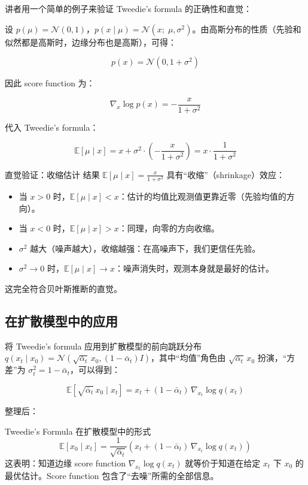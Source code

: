 \documentclass[a4paper]{article}
\begin{document}
讲者用一个简单的例子来验证 Tweedie's formula 的正确性和直觉：

设 $p(\mu) = \mathcal{N}(0, 1)$，$p(x \mid \mu) = \mathcal{N}(x;\; \mu, \sigma^2)$。由高斯分布的性质（先验和似然都是高斯时，边缘分布也是高斯），可得：

$$p(x) = \mathcal{N}(0, 1 + \sigma^2)$$

因此 score function 为：

$$\nabla_x \log p(x) = -\frac{x}{1 + \sigma^2}$$

代入 Tweedie's formula：

$$\mathbb{E}[\mu \mid x] = x + \sigma^2 \cdot \left(-\frac{x}{1+\sigma^2}\right) = x \cdot \frac{1}{1+\sigma^2}$$

\begin{knowledgebox}{直觉验证：收缩估计}
结果 $\mathbb{E}[\mu \mid x] = \frac{x}{1+\sigma^2}$ 具有``收缩''（shrinkage）效应：
\begin{itemize}
    \item 当 $x > 0$ 时，$\mathbb{E}[\mu \mid x] < x$：估计的均值比观测值更靠近零（先验均值的方向）。
    \item 当 $x < 0$ 时，$\mathbb{E}[\mu \mid x] > x$：同理，向零的方向收缩。
    \item $\sigma^2$ 越大（噪声越大），收缩越强：在高噪声下，我们更信任先验。
    \item $\sigma^2 \to 0$ 时，$\mathbb{E}[\mu \mid x] \to x$：噪声消失时，观测本身就是最好的估计。
\end{itemize}
这完全符合贝叶斯推断的直觉。
\end{knowledgebox}

\subsection{在扩散模型中的应用}

将 Tweedie's formula 应用到扩散模型的前向跳跃分布 $q(x_t \mid x_0) = \mathcal{N}(\sqrt{\bar{\alpha}_t}\, x_0, (1-\bar{\alpha}_t)I)$，其中``均值''角色由 $\sqrt{\bar{\alpha}_t}\, x_0$ 扮演，``方差''为 $\sigma_t^2 = 1-\bar{\alpha}_t$，可以得到：

$$\mathbb{E}[\sqrt{\bar{\alpha}_t}\, x_0 \mid x_t] = x_t + (1-\bar{\alpha}_t)\, \nabla_{x_t} \log q(x_t)$$

整理后：

\begin{importantbox}{Tweedie's Formula 在扩散模型中的形式}
$$\mathbb{E}[x_0 \mid x_t] = \frac{1}{\sqrt{\bar{\alpha}_t}} \left(x_t + (1-\bar{\alpha}_t)\, \nabla_{x_t} \log q(x_t)\right)$$
这表明：知道边缘 score function $\nabla_{x_t} \log q(x_t)$ 就等价于知道在给定 $x_t$ 下 $x_0$ 的最优估计。Score function 包含了``去噪''所需的全部信息。
\end{importantbox}
\end{document}
